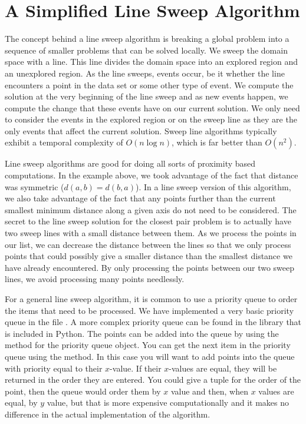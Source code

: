 \section*{A Simplified Line Sweep Algorithm}

The concept behind a line sweep algorithm is breaking a global problem into a sequence of smaller problems that can be solved locally.
We sweep the domain space with a line.
This line divides the domain space into an explored region and an unexplored region.
As the line sweeps, events occur, be it whether the line encounters a point in the data set
or some other type of event.  
We compute the solution at the very beginning of the line sweep and as new events happen, we compute the change that these events have on our current solution.
We only need to consider the events in the explored region or on the sweep line as they are the only events that affect the current solution.  
Sweep line algorithms typically exhibit a temporal complexity of $O(n \log n)$, which is far better than $O(n^2)$.

Line sweep algorithms are good for doing all sorts of proximity based computations.
In the example above, we took advantage of the fact that distance was symmetric ($d(a,b)=d(b,a)$).
In a line sweep version of this algorithm, we also take advantage of the fact that any points further than the current smallest minimum distance along a given axis do not need to be considered.
The secret to the line sweep solution for the closest pair problem is to actually have two sweep lines with a small distance between them.
As we process the points in our list, we can decrease the distance between the lines so that we only process points that could possibly give a smaller distance than the smallest distance we have already encountered.
By only processing the points between our two sweep lines, we avoid processing many points needlessly.

For a general line sweep algorithm, it is common to use a priority queue to order the items that need to be processed.
We have implemented a very basic priority queue in the file . 
A more complex priority queue can be found in the library  that is included in Python. 
The points can be added into the queue by using the  method for the priority queue object. 
You can get the next item in the priority queue using the  method. 
In this case you will want to add points into the queue with priority equal to their $x$-value. 
If their $x$-values are equal, they will be returned in the order they are entered. 
You could give a tuple for the order of the point, then the queue would order them by $x$ value and then, when $x$ values are equal, by $y$ value, but that is more expensive computationally and it makes no difference in the actual implementation of the algorithm. 


